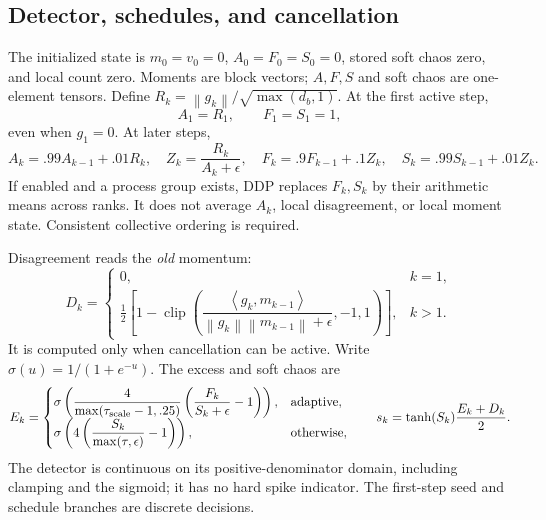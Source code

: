 \documentclass[11pt]{article}
\theoremstyle{definition}
\theoremstyle{remark}
\newcommand{\norm}[1]{\left\lVert#1\right\rVert}
\newcommand{\ip}[2]{\left\langle#1,#2\right\rangle}
\newcommand{\clip}{\operatorname{clip}}
\begin{document}
\subsection{Detector, schedules, and cancellation}
The initialized state is $m_0=v_0=0$, $A_0=F_0=S_0=0$, stored soft chaos zero,
and local count zero. Moments are block vectors; $A,F,S$ and soft chaos are
one-element tensors. Define $R_k=\norm{g_k}/\sqrt{\max(d_b,1)}$. At the first
active step,
\begin{equation}\label{eq:seed}
 A_1=R_1,\qquad F_1=S_1=1,
\end{equation}
even when $g_1=0$. At later steps,
\begin{equation}\label{eq:ema}
 A_k=.99 A_{k-1}+.01R_k,\quad Z_k=\frac{R_k}{A_k+\epsilon},\quad
 F_k=.9F_{k-1}+.1Z_k,\quad S_k=.99S_{k-1}+.01Z_k.
\end{equation}
If enabled and a process group exists, DDP replaces $F_k,S_k$ by their
arithmetic means across ranks. It does not average $A_k$, local disagreement,
or local moment state. Consistent collective ordering is required.

Disagreement reads the \emph{old} momentum:
\begin{equation}\label{eq:disagreement}
 D_k=\begin{cases}0,&k=1,\\
 \frac12\left[1-\clip\left(
 \dfrac{\ip{g_k}{m_{k-1}}}{\norm{g_k}\norm{m_{k-1}}+\epsilon},-1,1\right)\right],&k>1.
 \end{cases}
\end{equation}
It is computed only when cancellation can be active. Write $\sigma(u)=1/(1+e^{-u})$.
The excess and soft chaos are
\begin{equation}\label{eq:soft}
 E_k=\begin{cases}
 \sigma\left(\dfrac{4}{\max(\tau_{\rm scale}-1,.25)}
       \left(\dfrac{F_k}{S_k+\epsilon}-1\right)\right),&\text{adaptive},\\
 \sigma\left(4\left(\dfrac{S_k}{\max(\tau,\epsilon)}-1\right)\right),&\text{otherwise},
 \end{cases}
 \qquad s_k=\tanh(S_k)\frac{E_k+D_k}{2}.
\end{equation}
The detector is continuous on its positive-denominator domain, including
clamping and the sigmoid; it has no hard spike indicator. The first-step seed
and schedule branches are discrete decisions.
\end{document}
